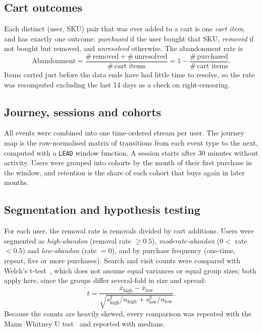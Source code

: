 \documentclass[11pt, a4paper]{article}
\begin{document}
\subsection{Cart outcomes}
Each distinct (user, SKU) pair that was ever added to a cart is one \emph{cart item}, and has exactly one outcome: \emph{purchased} if the user bought that SKU, \emph{removed} if not bought but removed, and \emph{unresolved} otherwise. The abandonment rate is
\begin{equation}
\text{Abandonment} = \frac{\#\,\text{removed} + \#\,\text{unresolved}}{\#\,\text{cart items}} = 1 - \frac{\#\,\text{purchased}}{\#\,\text{cart items}}.
\end{equation}
Items carted just before the data ends have had little time to resolve, so the rate was recomputed excluding the last 14 days as a check on right-censoring.

\subsection{Journey, sessions and cohorts}
All events were combined into one time-ordered stream per user. The journey map is the row-normalised matrix of transitions from each event type to the next, computed with a \texttt{LEAD} window function. A session starts after 30 minutes without activity. Users were grouped into cohorts by the month of their first purchase in the window, and retention is the share of each cohort that buys again in later months.

\subsection{Segmentation and hypothesis testing}
For each user, the removal rate is removals divided by cart additions. Users were segmented as \emph{high-abandon} (removal rate $\geq 0.5$), \emph{moderate-abandon} ($0 <$ rate $< 0.5$) and \emph{low-abandon} (rate $= 0$), and by purchase frequency (one-time, repeat, five or more purchases). Search and visit counts were compared with Welch's t-test~\cite{welch}, which does not assume equal variances or equal group sizes; both apply here, since the groups differ several-fold in size and spread:
\begin{equation}
t = \frac{\bar{x}_{\text{high}} - \bar{x}_{\text{low}}}{\sqrt{s^2_{\text{high}}/n_{\text{high}} + s^2_{\text{low}}/n_{\text{low}}}}.
\end{equation}
Because the counts are heavily skewed, every comparison was repeated with the Mann--Whitney U test~\cite{mannwhitney} and reported with medians.
\end{document}
